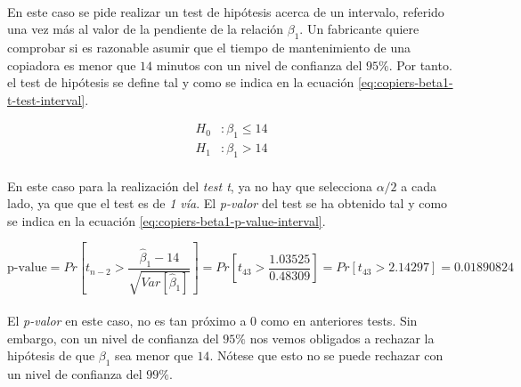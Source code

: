\documentclass{article}
\begin{document}
        \paragraph{}
        En este caso se pide realizar un test de hipótesis acerca de un intervalo, referido una vez más al valor de la pendiente de la relación $\beta_1$. Un fabricante quiere comprobar si es razonable asumir que el tiempo de mantenimiento de una copiadora es menor que $14$ minutos con un nivel de confianza del $95\%$. Por tanto. el test de hipótesis se define tal y como se indica en la ecuación \eqref{eq:copiers-beta1-t-test-interval}.

        \begin{equation}
        \label{eq:copiers-beta1-t-test-interval}
          \begin{split}
            H_0&: \beta_1 \leq 14 \\
            H_1&: \beta_1 > 14
          \end{split}
        \end{equation}

        \paragraph{}
        En este caso para la realización del \emph{test t}, ya no hay que selecciona $\alpha/2$ a cada lado, ya que que el test es de \emph{1 vía}. El \emph{p-valor} del test se ha obtenido tal y como se indica en la ecuación \eqref{eq:copiers-beta1-p-value-interval}.

        \begin{equation}
          \label{eq:copiers-beta1-p-value-interval}
            \text{p-value}
            = Pr\left[t_{n-2} > \frac{\widehat{\beta}_1 - 14}{\sqrt{Var\left[\widehat{\beta}_1\right]}}\right]
            = Pr\left[t_{43} > \frac{1.03525}{0.48309}\right]
            = Pr\left[t_{43} > 2.14297\right]
            = 0.01890824
        \end{equation}

        \paragraph{}
        El \emph{p-valor} en este caso, no es tan próximo a $0$ como en anteriores tests. Sin embargo, con un nivel de confianza del $95\%$ nos vemos obligados a rechazar la hipótesis de que $\beta_1$ sea menor que $14$. Nótese que esto no se puede rechazar con un nivel de confianza del $99\%$.
\end{document}
